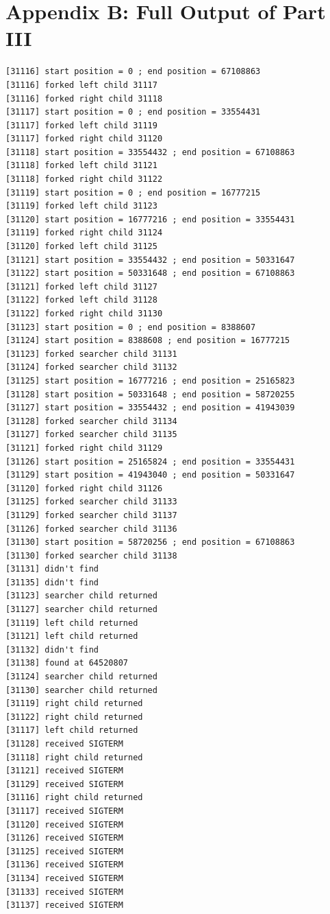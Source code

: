 \documentclass[11pt]{article}
\begin{document}
\newpage
\section*{Appendix B: Full Output of Part III}
\begin{footnotesize}
\begin{verbatim}
[31116] start position = 0 ; end position = 67108863
[31116] forked left child 31117
[31116] forked right child 31118
[31117] start position = 0 ; end position = 33554431
[31117] forked left child 31119
[31117] forked right child 31120
[31118] start position = 33554432 ; end position = 67108863
[31118] forked left child 31121
[31118] forked right child 31122
[31119] start position = 0 ; end position = 16777215
[31119] forked left child 31123
[31120] start position = 16777216 ; end position = 33554431
[31119] forked right child 31124
[31120] forked left child 31125
[31121] start position = 33554432 ; end position = 50331647
[31122] start position = 50331648 ; end position = 67108863
[31121] forked left child 31127
[31122] forked left child 31128
[31122] forked right child 31130
[31123] start position = 0 ; end position = 8388607
[31124] start position = 8388608 ; end position = 16777215
[31123] forked searcher child 31131
[31124] forked searcher child 31132
[31125] start position = 16777216 ; end position = 25165823
[31128] start position = 50331648 ; end position = 58720255
[31127] start position = 33554432 ; end position = 41943039
[31128] forked searcher child 31134
[31127] forked searcher child 31135
[31121] forked right child 31129
[31126] start position = 25165824 ; end position = 33554431
[31129] start position = 41943040 ; end position = 50331647
[31120] forked right child 31126
[31125] forked searcher child 31133
[31129] forked searcher child 31137
[31126] forked searcher child 31136
[31130] start position = 58720256 ; end position = 67108863
[31130] forked searcher child 31138
[31131] didn't find
[31135] didn't find
[31123] searcher child returned
[31127] searcher child returned
[31119] left child returned
[31121] left child returned
[31132] didn't find
[31138] found at 64520807
[31124] searcher child returned
[31130] searcher child returned
[31119] right child returned
[31122] right child returned
[31117] left child returned
[31128] received SIGTERM
[31118] right child returned
[31121] received SIGTERM
[31129] received SIGTERM
[31116] right child returned
[31117] received SIGTERM
[31120] received SIGTERM
[31126] received SIGTERM
[31125] received SIGTERM
[31136] received SIGTERM
[31134] received SIGTERM
[31133] received SIGTERM
[31137] received SIGTERM
\end{verbatim}
\end{footnotesize}
\end{document}
